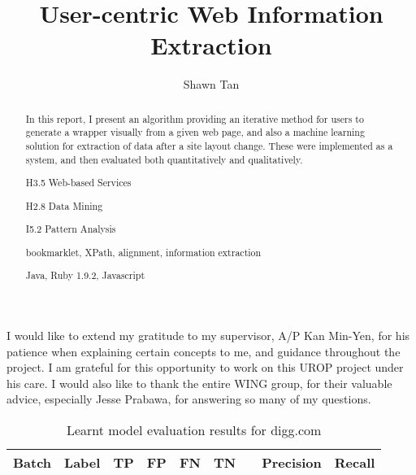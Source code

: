 \documentclass[urop]{socreport}
\begin{document}
\title{User-centric Web Information Extraction}
\author{Shawn Tan}
\maketitle
\begin{abstract}
In this report, I present an algorithm providing an iterative method for users to generate a 
wrapper visually from a given web page, and also a machine learning solution for extraction of
data after a site layout change. These were implemented as a system, and then evaluated 
both quantitatively and qualitatively. 

\begin{descriptors}
	\item H3.5 Web-based Services
    \item H2.8 Data Mining
	\item I5.2 Pattern Analysis
\end{descriptors}
\begin{keywords}
	bookmarklet,  XPath, alignment, information extraction
\end{keywords}
\begin{implement}
	Java, Ruby 1.9.2, Javascript
\end{implement}
\end{abstract}

\begin{acknowledgement}
	I would like to extend my gratitude to my supervisor, A/P Kan Min-Yen, for his patience
when explaining certain concepts to me, and guidance throughout the project. I am grateful
for this opportunity to work on this UROP project under his care. I would also like to thank
the entire WING group, for their valuable advice, especially Jesse Prabawa, for answering 
so many of my questions. 
\end{acknowledgement}

\listoffigures 
\listoftables
\tableofcontents 











\newpage
\appendix

\begin{table}
\centering
\small
\singlespacing
\begin{tabular}{|c|c|c|c|c|c|c|c|c|}
\hline
Batch	&Label	&TP	&FP	&FN	&TN	&	&Precision	&Recall\\
\hline

\hline 
\end{tabular}
\label{tab:mlevalresults}
\caption{Learnt model evaluation results for digg.com}
\end{table}
\end{document}
